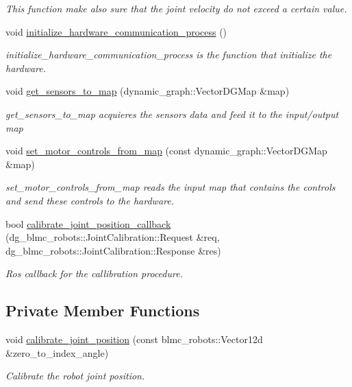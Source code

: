 \begin{DoxyCompactItemize}
\begin{DoxyCompactList}\small\item\em This function make also sure that the joint velocity do not exceed a certain value. \end{DoxyCompactList}\item 
void \hyperlink{classdg__blmc__robots_1_1DGMSolo12_a4d5af277b58accfedcadbac524b23efc}{initialize\+\_\+hardware\+\_\+communication\+\_\+process} ()
\begin{DoxyCompactList}\small\item\em initialize\+\_\+hardware\+\_\+communication\+\_\+process is the function that initialize the hardware. \end{DoxyCompactList}\item 
void \hyperlink{classdg__blmc__robots_1_1DGMSolo12_a407925fdfb633e0bfab911c90ca01c04}{get\+\_\+sensors\+\_\+to\+\_\+map} (dynamic\+\_\+graph\+::\+Vector\+D\+G\+Map \&map)
\begin{DoxyCompactList}\small\item\em get\+\_\+sensors\+\_\+to\+\_\+map acquieres the sensors data and feed it to the input/output map \end{DoxyCompactList}\item 
void \hyperlink{classdg__blmc__robots_1_1DGMSolo12_a8e7ed8c9ee0a69f3370c502ccf47d9c9}{set\+\_\+motor\+\_\+controls\+\_\+from\+\_\+map} (const dynamic\+\_\+graph\+::\+Vector\+D\+G\+Map \&map)
\begin{DoxyCompactList}\small\item\em set\+\_\+motor\+\_\+controls\+\_\+from\+\_\+map reads the input map that contains the controls and send these controls to the hardware. \end{DoxyCompactList}\item 
bool \hyperlink{classdg__blmc__robots_1_1DGMSolo12_af261744a5d36308874dc08d660711280}{calibrate\+\_\+joint\+\_\+position\+\_\+callback} (dg\+\_\+blmc\+\_\+robots\+::\+Joint\+Calibration\+::\+Request \&req, dg\+\_\+blmc\+\_\+robots\+::\+Joint\+Calibration\+::\+Response \&res)
\begin{DoxyCompactList}\small\item\em Ros callback for the callibration procedure. \end{DoxyCompactList}\end{DoxyCompactItemize}
\subsection*{Private Member Functions}
\begin{DoxyCompactItemize}
\item 
void \hyperlink{classdg__blmc__robots_1_1DGMSolo12_a63196391c1aee97f94c8c2f3a66b4a0b}{calibrate\+\_\+joint\+\_\+position} (const blmc\+\_\+robots\+::\+Vector12d \&zero\+\_\+to\+\_\+index\+\_\+angle)
\begin{DoxyCompactList}\small\item\em Calibrate the robot joint position. \end{DoxyCompactList}\end{DoxyCompactItemize}
